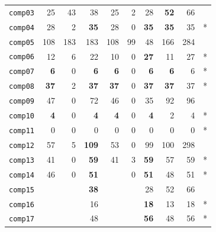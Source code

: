 \documentclass[authoryear,12pt]{article}
\begin{document}
{\begin{table}[htdp]
\begin{footnotesize}
\begin{center}
\begin{tabular}{lrrrrrrr>{\hspace{6ex}}r@{}l}
\texttt{comp03} & 25            & 43         & 38              & 25            & 2     & 28            & \textbf{52}   & 66            \\ %
\texttt{comp04} & 28            & 2          & \textbf{35}     & 28            & 0     & \textbf{35}   & \textbf{35}   & 35 & * \\ %
\texttt{comp05} & 108           & 183        & 183             & 108           & 99    & 48            & 166           & 284           \\ %
\texttt{comp06} & 12            & 6          & 22              & 10            & 0     & \textbf{27}   & 11            & 27  & *           \\ %
\texttt{comp07} & \textbf{6}    & 0          & \textbf{6}      & \textbf{6}    & 0     & \textbf{6}    & \textbf{6}    & 6 & *    \\ %
\texttt{comp08} & \textbf{37}   & 2          & \textbf{37}     & \textbf{37}   & 0     & \textbf{37}   & \textbf{37}   & 37 & *   \\ %
\texttt{comp09} & 47            & 0          & 72              & 46            & 0     & 35            & 92            & 96            \\ %
\texttt{comp10} & \textbf{4}    & 0          & \textbf{4}      & \textbf{4}    & 0     & \textbf{4}    & 2             & 4 & *    \\ %
\texttt{comp11} & 0             & 0          & 0               & 0             & 0     & 0             & 0             & 0 & *    \\ %
\texttt{comp12} & 57            & 5          & \textbf{109}    & 53            & 0     & 99            & 100           & 298           \\ %
\texttt{comp13} & 41            & 0          & \textbf{59}     & 41            & 3     & \textbf{59}   & 57            & 59 & *   \\ %
\texttt{comp14} & 46            & 0          & \textbf{51}     &               & 0     & \textbf{51}   & 48            & 51 & *  \\ %
\texttt{comp15} &               &            & \textbf{38}     &               &       & 28            & 52            & 66            \\ %
\texttt{comp16} &               &            & 16              &               &       & \textbf{18}   & 13            & 18 & *  \\ %
\texttt{comp17} &               &            & 48              &               &       & \textbf{56}   & 48            & 56 & *  \\ %

\end{tabular}
\end{center}
\end{footnotesize}
\end{table}}
\end{document}
